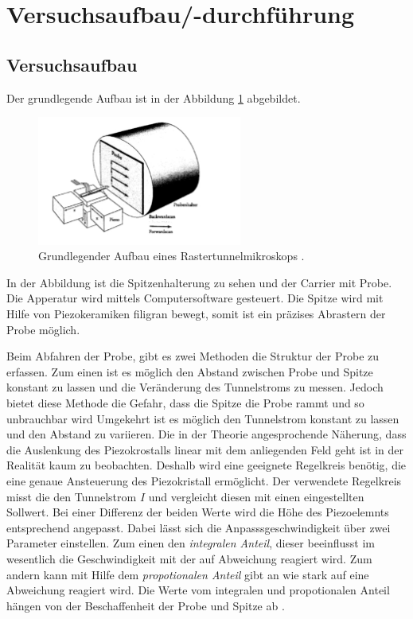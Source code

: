 \section{Versuchsaufbau/-durchführung}

\subsection{Versuchsaufbau}
Der grundlegende Aufbau ist in der Abbildung \ref{fig: aufbau} abgebildet.
\begin{figure}[!h]
  \centering
  \includegraphics[width=0.6\textwidth]{./pics/aufbau.png}
  \caption{Grundlegender Aufbau eines Rastertunnelmikroskops \cite{anleitung_frankfurt}.}
  \label{fig: aufbau}
\end{figure}
In der Abbildung ist die Spitzenhalterung zu sehen und
der Carrier mit Probe. Die Apperatur wird mittels Computersoftware gesteuert.
Die Spitze wird mit Hilfe von Piezokeramiken filigran bewegt, somit
ist ein präzises Abrastern der Probe möglich.

Beim Abfahren der Probe, gibt es zwei Methoden die Struktur der Probe zu erfassen.
Zum einen ist es möglich den Abstand zwischen Probe und Spitze konstant zu lassen
und die Veränderung des Tunnelstroms zu messen.
Jedoch bietet diese Methode die Gefahr, dass die Spitze die Probe rammt und so unbrauchbar wird
Umgekehrt ist es möglich den Tunnelstrom konstant zu lassen und den Abstand zu variieren.
Die in der Theorie angesprochende Näherung, dass die Auslenkung des Piezokrostalls linear
mit dem anliegenden Feld geht ist in der Realität kaum zu beobachten. Deshalb wird eine
geeignete Regelkreis benötig, die eine genaue Ansteuerung des Piezokristall ermöglicht.
Der verwendete Regelkreis misst die den Tunnelstrom $I$ und vergleicht diesen mit einen
eingestellten Sollwert. Bei einer Differenz der beiden Werte wird die Höhe des Piezoelemnts
entsprechend angepasst. Dabei lässt sich die Anpasssgeschwindigkeit über zwei Parameter
einstellen. Zum einen den \emph{integralen Anteil}, dieser beeinflusst im wesentlich die
Geschwindigkeit mit der auf Abweichung reagiert wird. Zum andern kann mit Hilfe
dem \emph{propotionalen Anteil} gibt an wie stark auf eine Abweichung reagiert wird.
Die Werte vom integralen und propotionalen Anteil hängen von der Beschaffenheit
der Probe und Spitze ab \cite{anleitung_frankfurt}.


